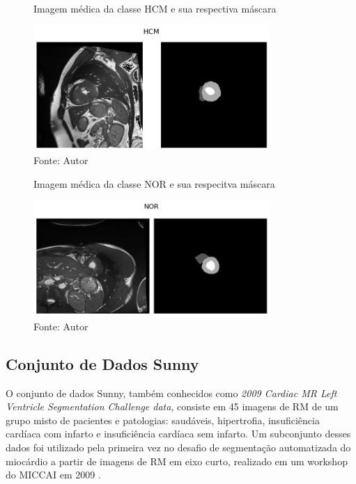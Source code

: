 \begin{figure}[H]
    \centering
    \captionsetup{width=0.98\textwidth, justification=justified}
    \caption{Imagem médica da classe HCM e sua respectiva máscara}
    \includegraphics[width=0.8\textwidth]{figures/fig033-02.png}
    \caption*{Fonte: Autor}
    \label{fig:fig033-02}
\end{figure}

\begin{figure}[H]
    \centering
    \captionsetup{width=0.98\textwidth, justification=justified}
    \caption{Imagem médica da classe NOR e sua respecitva máscara}
    \includegraphics[width=0.8\textwidth]{figures/fig033-03.png}
    \caption*{Fonte: Autor}
    \label{fig:fig033-03}
\end{figure}

\subsection{Conjunto de Dados Sunny} 
\label{subsec:cap4_sunny}

O conjunto de dados Sunny, também conhecidos como \textit{2009 Cardiac MR Left Ventricle Segmentation Challenge data}, consiste em 45 imagens de RM de um grupo misto de pacientes e patologias: saudáveis, hipertrofia, insuficiência cardíaca com infarto e insuficiência cardíaca sem infarto. Um subconjunto desses dados foi utilizado pela primeira vez no desafio de segmentação automatizada do miocárdio a partir de imagens de RM em eixo curto, realizado em um workshop do MICCAI em 2009 \cite{radauEvaluationFrameworkAlgorithms2009}. 


